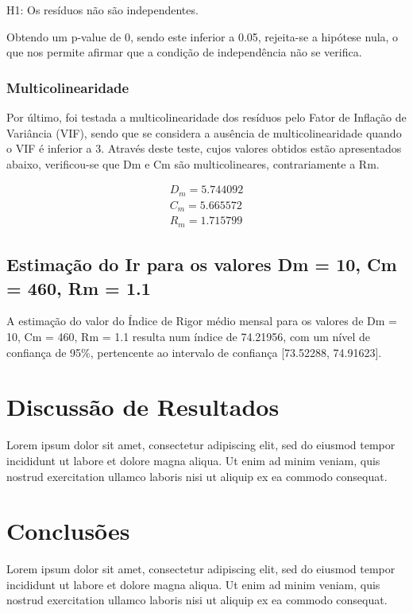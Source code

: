 \documentclass[conference]{IEEEtran}
\begin{document}
H1: Os resíduos não são independentes.

Obtendo um p-value de 0, sendo este inferior a 0.05, rejeita-se a hipótese nula, o que nos permite afirmar que a condição de independência não se verifica.

\subsubsection{Multicolinearidade} 
Por último, foi testada a multicolinearidade dos resíduos pelo Fator de Inflação de Variância (VIF), sendo que se considera a ausência de multicolinearidade quando o VIF é inferior a 3. Através deste teste, cujos valores obtidos estão apresentados abaixo, verificou-se que Dm e Cm são multicolineares, contrariamente a Rm.

\begin{equation}
\begin{array}{l}
	D_{m}=5.744092 \\
	C_{m}=5.665572 \\
	R_{m}=1.715799
\end{array}
\end{equation}


\subsection{Estimação do Ir para os valores Dm = 10, Cm = 460, Rm = 1.1}
A estimação do valor do Índice de Rigor médio mensal para os valores de Dm = 10, Cm = 460, Rm = 1.1 resulta num índice de 74.21956, com um nível de confiança de 95\%, pertencente ao intervalo de confiança [73.52288, 74.91623].


\section{Discussão de Resultados} %
Lorem ipsum dolor sit amet, consectetur adipiscing elit, sed do eiusmod tempor incididunt ut labore et dolore magna aliqua. Ut enim ad minim veniam, quis nostrud exercitation ullamco laboris nisi ut aliquip ex ea commodo consequat.

\section{Conclusões} %
Lorem ipsum dolor sit amet, consectetur adipiscing elit, sed do eiusmod tempor incididunt ut labore et dolore magna aliqua. Ut enim ad minim veniam, quis nostrud exercitation ullamco laboris nisi ut aliquip ex ea commodo consequat.
\end{document}
